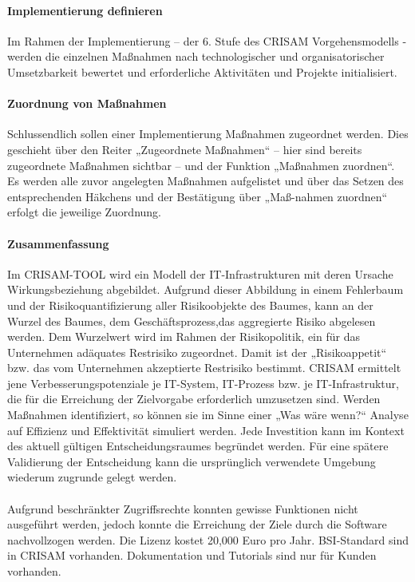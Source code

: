 \paragraph{Implementierung definieren}
Im Rahmen der Implementierung – der 6. Stufe des CRISAM Vorgehensmodells - werden die einzelnen Maßnahmen nach technologischer und organisatorischer Umsetzbarkeit bewertet und erforderliche Aktivitäten und Projekte initialisiert.
\paragraph{Zuordnung von Maßnahmen}
Schlussendlich sollen einer Implementierung Maßnahmen zugeordnet werden. Dies geschieht über den Reiter „Zugeordnete Maßnahmen“ – hier sind bereits zugeordnete Maßnahmen sichtbar – und der Funktion „Maßnahmen zuordnen“. Es werden alle zuvor angelegten Maßnahmen aufgelistet und über das Setzen des entsprechenden Häkchens und der Bestätigung über „Maß-nahmen zuordnen“ erfolgt die jeweilige Zuordnung.
\paragraph{Zusammenfassung}
Im CRISAM-TOOL wird ein Modell der IT-Infrastrukturen mit deren Ursache Wirkungsbeziehung abgebildet. Aufgrund dieser Abbildung in einem Fehlerbaum und der Risikoquantifizierung aller Risikoobjekte des Baumes, kann an der Wurzel des Baumes, dem Geschäftsprozess,das aggregierte Risiko abgelesen werden. Dem Wurzelwert wird im Rahmen der Risikopolitik, ein für das Unternehmen adäquates Restrisiko zugeordnet. Damit ist der „Risikoappetit“ bzw. das vom Unternehmen akzeptierte Restrisiko bestimmt.
CRISAM ermittelt jene Verbesserungspotenziale je IT-System, IT-Prozess bzw. je IT-Infrastruktur,
die für die Erreichung der Zielvorgabe erforderlich umzusetzen sind.
Werden Maßnahmen identifiziert, so können sie im Sinne einer „Was wäre wenn?“ Analyse auf Effizienz und Effektivität simuliert werden. Jede Investition kann im Kontext des aktuell gültigen Entscheidungsraumes begründet werden. Für eine spätere Validierung der Entscheidung kann die ursprünglich verwendete Umgebung wiederum zugrunde gelegt werden.
\\
\\
Aufgrund beschränkter Zugriffsrechte konnten gewisse Funktionen nicht ausgeführt werden, jedoch konnte die Erreichung der Ziele durch die Software nachvollzogen werden.
Die Lizenz kostet 20,000 Euro pro Jahr. BSI-Standard sind in CRISAM vorhanden. Dokumentation und Tutorials sind nur für Kunden vorhanden. 


